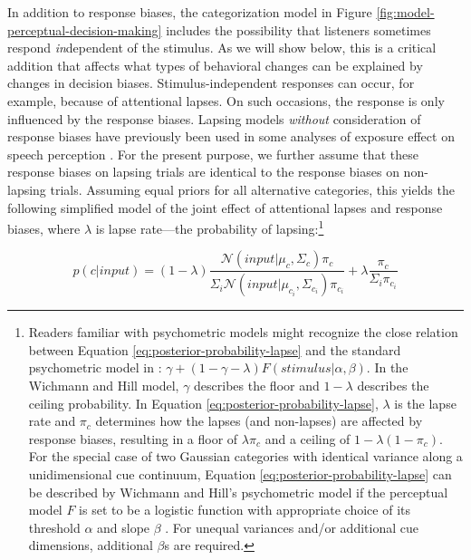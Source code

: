 \documentclass[
  11pt,
  man,floatsintext]{apa6}
\begin{document}
In addition to response biases, the categorization model in Figure \ref{fig:model-perceptual-decision-making} includes the possibility that listeners sometimes respond \emph{in}dependent of the stimulus. As we will show below, this is a critical addition that affects what types of behavioral changes can be explained by changes in decision biases. Stimulus-independent responses can occur, for example, because of attentional lapses. On such occasions, the response is only influenced by the response biases. Lapsing models \emph{without} consideration of response biases have previously been used in some analyses of exposure effect on speech perception \autocite{clayards2008,mcmurray-jongman2011,kleinschmidt-jaeger2016cogsci}. For the present purpose, we further assume that these response biases on lapsing trials are identical to the response biases on non-lapsing trials. Assuming equal priors for all alternative categories, this yields the following simplified model of the joint effect of attentional lapses and response biases, where \(\lambda\) is lapse rate---the probability of lapsing:\footnote{Readers familiar with psychometric models might recognize the close relation between Equation \eqref{eq:posterior-probability-lapse} and the standard psychometric model in \textcite{wichmann-hill2001}: \(\gamma + (1-\gamma-\lambda) F(stimulus | \alpha, \beta)\). In the Wichmann and Hill model, \(\gamma\) describes the floor and \(1-\lambda\) describes the ceiling probability. In Equation \eqref{eq:posterior-probability-lapse}, \(\lambda\) is the lapse rate and \(\pi_c\) determines how the lapses (and non-lapses) are affected by response biases, resulting in a floor of \(\lambda \pi_c\) and a ceiling of \(1 - \lambda(1 - \pi_c)\). For the special case of two Gaussian categories with identical variance along a unidimensional cue continuum, Equation \eqref{eq:posterior-probability-lapse} can be described by Wichmann and Hill's psychometric model if the perceptual model \(F\) is set to be a logistic function with appropriate choice of its threshold \(\alpha\) and slope \(\beta\) \autocite[cf.][200]{kleinschmidt-jaeger2015}. For unequal variances and/or additional cue dimensions, additional \(\beta\)s are required.}

\begin{equation}\label{eq:posterior-probability-lapse}
p(c | input) = (1 - \lambda) \frac{\mathcal{N}\!\left( input | \mu_c, \Sigma_c \right) \pi_c}{\Sigma_i \mathcal{N}\!\left( input | \mu_{c_i}, \Sigma_{c_i} \right) \pi_{c_i}} + \lambda \frac{\pi_c}{\Sigma_i \pi_{c_i}}
\end{equation}
\end{document}
